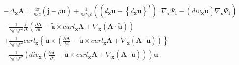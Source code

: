 \documentclass{article}
\theoremstyle{definition}
\theoremstyle{remark}
\renewcommand{\vec}[1]{\mathbf{#1}}
\begin{document}
\begin{multline}\label{MaxVacFullPPNnnnffffffyuughjhjhjhhjjkjhkkjhujgGG}
-\Delta_{\vec x}\vec A= \frac{4\pi}{\kappa_0 c}\left(\vec j-\rho\vec
{\tilde u}\right)+\frac{1}{\kappa_0\gamma_0 c}\left(\left(d_{\vec
x}\vec {\tilde u}+\left\{d_{\vec x}\vec {\tilde
u}\right\}^T\right)\cdot \nabla_{\vec x}\Psi_1-\left(div_{\vec
x}\vec {\tilde u}\right)\nabla_{\vec
x}\Psi_1\right)\\-\frac{1}{\kappa_0\gamma_0
c^2}\frac{\partial}{\partial t}\left(\frac{\partial\vec A}{\partial
t}-\vec {\tilde u}\times curl_{\vec x}\vec A+\nabla_{\vec
x}\left(\vec A\cdot\vec {\tilde
u}\right)\right)\\+\frac{1}{\kappa_0\gamma_0 c^2}curl_{\vec x}
\left\{\vec {\tilde u}\times
\left(\frac{\partial\vec A}{\partial t}-\vec {\tilde u}\times
curl_{\vec x}\vec A+\nabla_{\vec x}\left(\vec A\cdot\vec {\tilde
u}\right)\right)\right\}\\-\frac{1}{\kappa_0\gamma_0
c^2}\left(div_{\vec x}\left(\frac{\partial\vec A}{\partial t}-\vec
{\tilde u}\times curl_{\vec x}\vec A+\nabla_{\vec x}\left(\vec
A\cdot\vec {\tilde u}\right)\right)\right)\vec {\tilde u}.
\end{multline}
\end{document}
